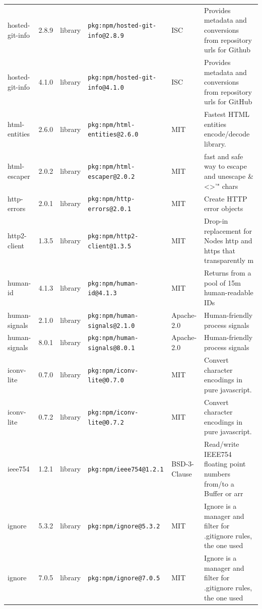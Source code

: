 \documentclass[11pt,a4paper]{article}
\begin{document}
\begin{longtable}{|p{4cm}|p{2cm}|p{1.6cm}|p{5cm}|p{1.5cm}|p{3.5cm}|}
\raggedright hosted-git-info & 2.8.9 & library & \small\texttt{pkg:npm/hosted-git-info@2.8.9} & ISC & \small Provides metadata and conversions from repository urls for Github \\
\raggedright hosted-git-info & 4.1.0 & library & \small\texttt{pkg:npm/hosted-git-info@4.1.0} & ISC & \small Provides metadata and conversions from repository urls for GitHub \\
\raggedright html-entities & 2.6.0 & library & \small\texttt{pkg:npm/html-entities@2.6.0} & MIT & \small Fastest HTML entities encode/decode library. \\
\raggedright html-escaper & 2.0.2 & library & \small\texttt{pkg:npm/html-escaper@2.0.2} & MIT & \small fast and safe way to escape and unescape \&\textless{}\textgreater{}'" chars \\
\raggedright http-errors & 2.0.1 & library & \small\texttt{pkg:npm/http-errors@2.0.1} & MIT & \small Create HTTP error objects \\
\raggedright http2-client & 1.3.5 & library & \small\texttt{pkg:npm/http2-client@1.3.5} & MIT & \small Drop-in replacement for Nodes http and https that transparently m \\
\raggedright human-id & 4.1.3 & library & \small\texttt{pkg:npm/human-id@4.1.3} & MIT & \small Returns from a pool of 15m human-readable IDs \\
\raggedright human-signals & 2.1.0 & library & \small\texttt{pkg:npm/human-signals@2.1.0} & Apache-2.0 & \small Human-friendly process signals \\
\raggedright human-signals & 8.0.1 & library & \small\texttt{pkg:npm/human-signals@8.0.1} & Apache-2.0 & \small Human-friendly process signals \\
\raggedright iconv-lite & 0.7.0 & library & \small\texttt{pkg:npm/iconv-lite@0.7.0} & MIT & \small Convert character encodings in pure javascript. \\
\raggedright iconv-lite & 0.7.2 & library & \small\texttt{pkg:npm/iconv-lite@0.7.2} & MIT & \small Convert character encodings in pure javascript. \\
\raggedright ieee754 & 1.2.1 & library & \small\texttt{pkg:npm/ieee754@1.2.1} & BSD-3-Clause & \small Read/write IEEE754 floating point numbers from/to a Buffer or arr \\
\raggedright ignore & 5.3.2 & library & \small\texttt{pkg:npm/ignore@5.3.2} & MIT & \small Ignore is a manager and filter for .gitignore rules, the one used \\
\raggedright ignore & 7.0.5 & library & \small\texttt{pkg:npm/ignore@7.0.5} & MIT & \small Ignore is a manager and filter for .gitignore rules, the one used \\

\end{longtable}
\end{document}
